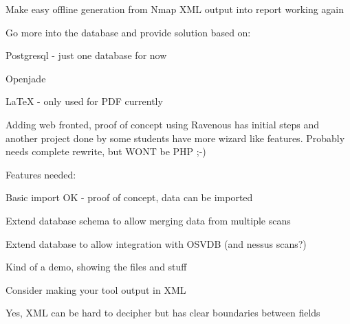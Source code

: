 \documentclass[18pt,landscape,a4paper]{foils}
\begin{document}

\begin{list1}
\item Make easy offline generation from Nmap XML output into report
  working again
\item Go more into the database and provide solution based on:
\begin{list2}
\item Postgresql - just one database for now
\item Openjade
\item LaTeX - only used for PDF currently    
\item Adding web fronted, proof of concept using Ravenous has initial
  steps and another project done by some students have more wizard
  like features. Probably needs complete rewrite, but WONT be PHP ;-)
\end{list2}
\item Features needed:
\begin{list2}
\item Basic import OK - proof of concept, data can be imported
\item Extend database schema to allow merging data from multiple scans
\item Extend database to allow integration with OSVDB (and nessus scans?)
\end{list2}

\end{list1}


\begin{list1}
\item Kind of a demo, showing the files and stuff
\end{list1}


\begin{list1}
\item Consider making your tool output in XML
\item Yes, XML can be hard to decipher but has clear boundaries
  between fields  
\end{list1}
\end{document}
